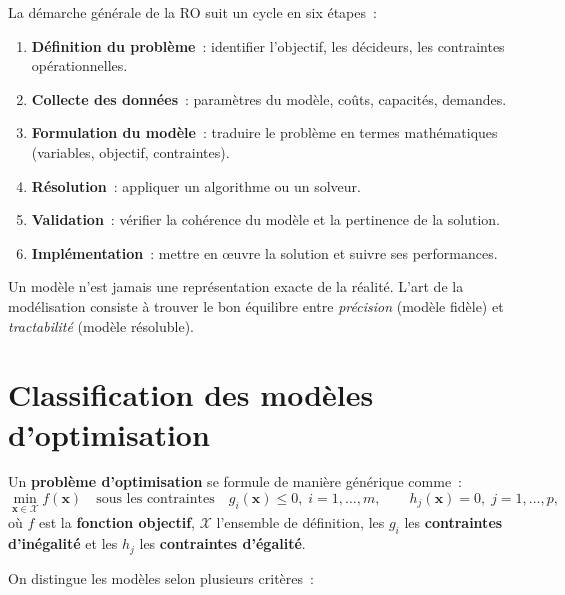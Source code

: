 La d\'emarche g\'en\'erale de la RO suit un cycle en six \'etapes~:

\begin{enumerate}
  \item \textbf{D\'efinition du probl\`eme}~: identifier l'objectif, les
        d\'ecideurs, les contraintes op\'erationnelles.
  \item \textbf{Collecte des donn\'ees}~: param\`etres du mod\`ele, co\^uts,
        capacit\'es, demandes.
  \item \textbf{Formulation du mod\`ele}~: traduire le probl\`eme en termes
        math\'ematiques (variables, objectif, contraintes).
  \item \textbf{R\'esolution}~: appliquer un algorithme ou un solveur.
  \item \textbf{Validation}~: v\'erifier la coh\'erence du mod\`ele et la
        pertinence de la solution.
  \item \textbf{Impl\'ementation}~: mettre en \oe uvre la solution et suivre
        ses performances.
\end{enumerate}

\begin{intuition}[title=\textbf{Mod\'eliser, c'est simplifier}]
Un mod\`ele n'est jamais une repr\'esentation exacte de la r\'ealit\'e.
L'art de la mod\'elisation consiste \`a trouver le bon \'equilibre entre
\emph{pr\'ecision} (mod\`ele fid\`ele) et \emph{tractabilit\'e} (mod\`ele
r\'esoluble).
\end{intuition}

\section{Classification des mod\`eles d'optimisation}

\begin{definition}
Un \textbf{probl\`eme d'optimisation} se formule de mani\`ere g\'en\'erique
comme~:
\[
  \min_{\mathbf{x} \in \mathcal{X}} f(\mathbf{x})
  \quad \text{sous les contraintes} \quad
  g_i(\mathbf{x}) \le 0, \; i = 1, \ldots, m,
  \qquad
  h_j(\mathbf{x}) = 0, \; j = 1, \ldots, p,
\]
o\`u $f$ est la \textbf{fonction objectif}, $\mathcal{X}$ l'ensemble de
d\'efinition, les $g_i$ les \textbf{contraintes d'in\'egalit\'e} et les $h_j$
les \textbf{contraintes d'\'egalit\'e}.
\end{definition}

On distingue les mod\`eles selon plusieurs crit\`eres~:

